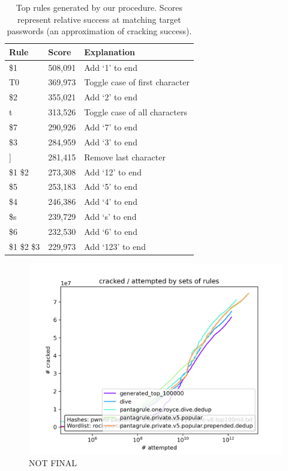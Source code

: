 \documentclass[letterpaper,twocolumn,10pt]{article}
\begin{document}
\begin{table}
\centering
\begin{tabular}{|l|l|l|}
\hline
Rule & Score & Explanation \\
\hline
\$1 & 508,091 & Add `1' to end \\
T0 & 369,973 & Toggle case of first character \\
\$2 & 355,021 & Add `2' to end \\
t & 313,526 & Toggle case of all characters \\
\$7 & 290,926 & Add `7' to end \\
\$3 & 284,959 & Add `3' to end \\
] & 281,415 & Remove last character \\
\$1 \$2 & 273,308 & Add `12' to end \\
\$5 & 253,183 & Add `5' to end \\
\$4 & 246,386 & Add `4' to end \\
\$s & 239,729 & Add `s' to end \\
\$6 & 232,530 & Add `6' to end \\
\$1 \$2 \$3 & 229,973 & Add `123' to end \\
\hline
\end{tabular}
\caption{Top rules generated by our procedure. Scores represent relative
success at matching target passwords (an approximation of cracking success).}
\label{tab:top_rules}
\end{table}

\begin{figure}[h]
    \includegraphics[width=\linewidth]
    {../cracked_attempted_plot_08318a9a-a503-11ed-9d73-005056c00001.png}
    \caption{NOT FINAL}
    \label{fig:cracked-attempted}
\end{figure}
\end{document}
